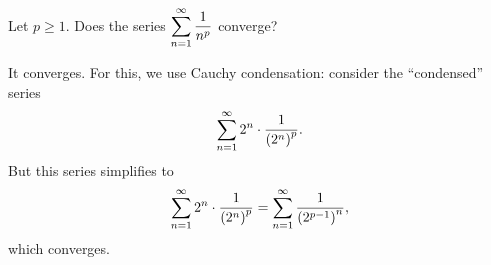 \begin{example}
Let $p \geq 1$.  Does the series $\displaystyle\sum_{n=1}^\infty \displaystyle\frac{1}{n^p}$ converge?
\end{example}

\begin{solution}
  It converges.  For this, we use Cauchy condensation: consider the ``condensed'' series
$$
\displaystyle\sum_{n=1}^\infty 2^n \cdot \displaystyle\frac{1}{\left( 2^n \right)^p}.
$$
But this series simplifies to
$$
\displaystyle\sum_{n=1}^\infty 2^n \cdot \displaystyle\frac{1}{\left( 2^n \right)^p} =
\displaystyle\sum_{n=1}^\infty  \displaystyle\frac{1}{\left( 2^{p-1} \right)^n},
$$
which converges.
\end{solution}

